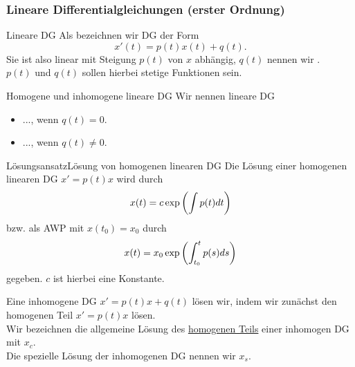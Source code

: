 \subsubsection{Lineare Differentialgleichungen (erster Ordnung)}
\begin{Def}
{Lineare DG}
Als  bezeichnen wir DG der Form
\begin{equation*}
    x'(t)=p(t)x(t)+q(t).
\end{equation*}
Sie ist also linear mit Steigung $p(t)$ von $x$ abhängig, $q(t)$ nennen wir .\\
$p(t)$ und $q(t)$ sollen hierbei stetige Funktionen sein.
\end{Def}
\begin{Def}
{Homogene und inhomogene lineare DG}
Wir nennen lineare DG
\begin{itemize}
    \item ..., wenn $q(t)= 0$.
    \item ..., wenn $q(t)\neq 0$.
\end{itemize}
\end{Def}
\begin{Satz}
{Lösungsansatz}{Lösung von homogenen linearen DG}
Die Lösung einer homogenen linearen DG $x'=p(t)x$ wird durch
\begin{equation*}
    x(t)=c \exp\left({\int p(t)dt}\right)
\end{equation*}
bzw. als AWP mit $x(t_0)=x_0$ durch
\begin{equation*}
    x(t)=x_0\exp\left({\int_{t_0}^tp(s)ds}\right)
\end{equation*}
gegeben. $c$ ist hierbei eine Konstante.
\end{Satz}
Eine inhomogene DG $x'=p(t)x+q(t)$ lösen wir, indem wir zunächst den homogenen Teil $x'=p(t)x$ lösen.\\
Wir bezeichnen die allgemeine Lösung des \underline{homogenen Teils} einer inhomogen DG mit $x_c$.\\
Die spezielle Lösung der inhomogenen DG nennen wir $x_s$.\\
